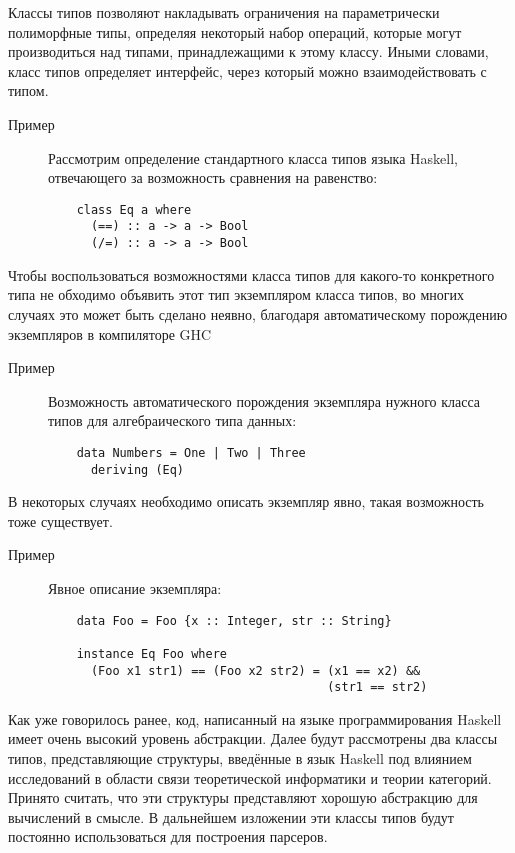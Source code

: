 Классы типов позволяют накладывать ограничения на параметрически полиморфные типы, определяя некоторый набор операций, которые могут производиться над типами, принадлежащими к этому классу. Иными словами, класс типов определяет интерфейс, через который можно взаимодействовать с типом.

\begin{description}
  \item[Пример] 
  Рассмотрим определение стандартного класса типов языка Haskell, отвечающего за возможность сравнения на равенство:
  \begin{lstlisting}
    class Eq a where
      (==) :: a -> a -> Bool
      (/=) :: a -> a -> Bool
  \end{lstlisting}
\end{description}

Чтобы воспользоваться возможностями класса типов для какого-то конкретного типа не обходимо объявить этот тип экземпляром класса типов, во многих случаях это может быть сделано неявно, благодаря автоматическому порождению экземпляров в компиляторе GHC

\begin{description}
  \item[Пример] 
  Возможность автоматического порождения экземпляра нужного класса типов для алгебраического типа данных:
  \begin{lstlisting}
    data Numbers = One | Two | Three 
      deriving (Eq)
  \end{lstlisting}
\end{description}

В некоторых случаях необходимо описать экземпляр явно, такая возможность тоже существует.

\begin{description}
  \item[Пример] 
  Явное описание экземпляра:
  \begin{lstlisting}
    data Foo = Foo {x :: Integer, str :: String}
 
    instance Eq Foo where
      (Foo x1 str1) == (Foo x2 str2) = (x1 == x2) && 
                                       (str1 == str2)
  \end{lstlisting}
\end{description}

Как уже говорилось ранее, код, написанный на языке программирования Haskell имеет очень высокий уровень абстракции. Далее будут рассмотрены два классы типов, представляющие структуры, введённые в язык Haskell под влиянием исследований в области связи теоретической информатики и теории категорий. Принято считать, что эти структуры представляют хорошую абстракцию для вычислений в смысле. В дальнейшем изложении эти классы типов будут постоянно использоваться для построения парсеров. 


